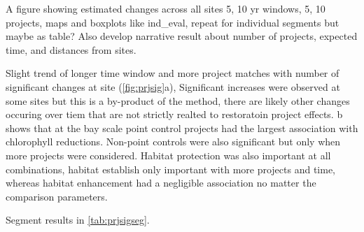 \documentclass[]{article}
\begin{document}
A figure showing estimated changes across all sites 5, 10 yr windows, 5,
10 projects, maps and boxplots like ind\_eval, repeat for individual
segments but maybe as table? Also develop narrative result about number
of projects, expected time, and distances from sites.

Slight trend of longer time window and more project matches with number
of significant changes at site (\cref{fig:prjsig}a), Significant
increases were observed at some sites but this is a by-product of the
method, there are likely other changes occuring over tiem that are not
strictly realted to restoratoin project effects. b
shows that at the bay scale point control projects had the largest
association with chlorophyll reductions. Non-point controls were also
significant but only when more projects were considered. Habitat
protection was also important at all combinations, habitat establish
only important with more projects and time, whereas habitat enhancement
had a negligible association no matter the comparison parameters.

Segment results in \cref{tab:prjsigseg}.
\end{document}
